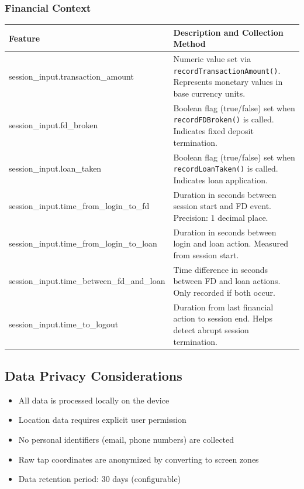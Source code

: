 \documentclass[11pt]{article}
\begin{document}
\subsubsection{Financial Context}
\renewcommand{\arraystretch}{1.5}
{\small
\begin{longtable}{|p{}|p{}|}
    \hline
    \textbf{Feature} & \textbf{Description and Collection Method} \\
    \hline
    session\_input.transaction\_amount & Numeric value set via \texttt{recordTransactionAmount()}. Represents monetary values in base currency units. \\
    \hline
    session\_input.fd\_broken & Boolean flag (true/false) set when \texttt{recordFDBroken()} is called. Indicates fixed deposit termination. \\
    \hline
    session\_input.loan\_taken & Boolean flag (true/false) set when \texttt{recordLoanTaken()} is called. Indicates loan application. \\
    \hline
    session\_input.time\_from\_login\_to\_fd & Duration in seconds between session start and FD event. Precision: 1 decimal place. \\
    \hline
    session\_input.time\_from\_login\_to\_loan & Duration in seconds between login and loan action. Measured from session start. \\
    \hline
    session\_input.time\_between\_fd\_and\_loan & Time difference in seconds between FD and loan actions. Only recorded if both occur. \\
    \hline
    session\_input.time\_to\_logout & Duration from last financial action to session end. Helps detect abrupt session termination. \\
    \hline
\end{longtable}}
\renewcommand{\arraystretch}{1.0}

\subsection{Data Privacy Considerations}
\begin{itemize}
    \item All data is processed locally on the device
    \item Location data requires explicit user permission
    \item No personal identifiers (email, phone numbers) are collected
    \item Raw tap coordinates are anonymized by converting to screen zones
    \item Data retention period: 30 days (configurable)
\end{itemize}
\end{document}
